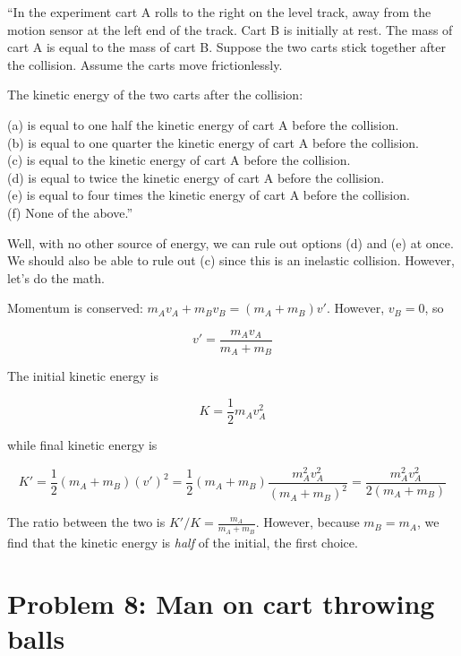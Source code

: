 \documentclass[8.01x]{subfiles}
\begin{document}
``In the experiment cart A rolls to the right on the level track, away from the motion sensor at the left end of the track. Cart B is initially at rest. The mass of cart A is equal to the mass of cart B. Suppose the two carts stick together after the collision. Assume the carts move frictionlessly.

The kinetic energy of the two carts after the collision:

(a) is equal to one half the kinetic energy of cart A before the collision.\\
(b) is equal to one quarter the kinetic energy of cart A before the collision.\\
(c) is equal to the kinetic energy of cart A before the collision.\\
(d) is equal to twice the kinetic energy of cart A before the collision.\\
(e) is equal to four times the kinetic energy of cart A before the collision.\\
(f) None of the above.''

Well, with no other source of energy, we can rule out options (d) and (e) at once. We should also be able to rule out (c) since this is an inelastic collision. However, let's do the math.

Momentum is conserved: $m_A v_A + m_B v_B = (m_A + m_B) v'$. However, $v_B = 0$, so

\begin{equation}
v' = \frac{m_A v_A}{m_A + m_B}
\end{equation}

The initial kinetic energy is

\begin{equation}
K = \frac{1}{2} m_A v_A^2
\end{equation}

while final kinetic energy is

\begin{equation}
K' = \frac{1}{2} (m_A + m_B) (v')^2 = \frac{1}{2} (m_A + m_B) \frac{m_A^2 v_A^2}{(m_A + m_B)^2} = \frac{m_A^2 v_A^2}{2(m_A + m_B)}
\end{equation}

The ratio between the two is $K'/K = \frac{m_A}{m_A + m_B}$. However, because $m_B = m_A$, we find that the kinetic energy is \emph{half} of the initial, the first choice.

\section{Problem 8: Man on cart throwing balls}
\end{document}
